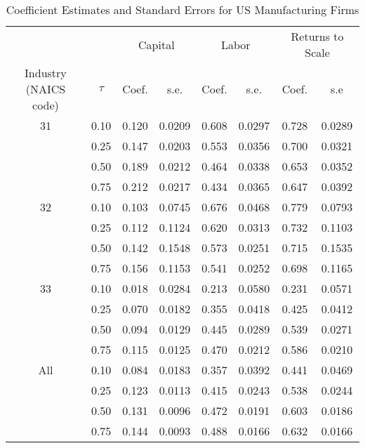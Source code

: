 \begin{table}[ht]
\centering
\caption{Coefficient Estimates and Standard Errors for US Manufacturing Firms} 
\begin{tabular}{cccccccc}
  \hline\hline & & \multicolumn{2}{c}{Capital}  & \multicolumn{2}{c}{Labor} & \multicolumn{2}{c}{Returns to Scale} \\ \cmidrule(lr){3-4} \cmidrule(lr){5-6} \cmidrule(lr){7-8}Industry (NAICS code) & $\tau$ & Coef. & s.e. & Coef. & s.e. & Coef. & s.e \\ 
  \hline
31 & 0.10 & 0.120 & 0.0209 & 0.608 & 0.0297 & 0.728 & 0.0289 \\ 
   & 0.25 & 0.147 & 0.0203 & 0.553 & 0.0356 & 0.700 & 0.0321 \\ 
   & 0.50 & 0.189 & 0.0212 & 0.464 & 0.0338 & 0.653 & 0.0352 \\ 
   & 0.75 & 0.212 & 0.0217 & 0.434 & 0.0365 & 0.647 & 0.0392 \\ 
  32 & 0.10 & 0.103 & 0.0745 & 0.676 & 0.0468 & 0.779 & 0.0793 \\ 
   & 0.25 & 0.112 & 0.1124 & 0.620 & 0.0313 & 0.732 & 0.1103 \\ 
   & 0.50 & 0.142 & 0.1548 & 0.573 & 0.0251 & 0.715 & 0.1535 \\ 
   & 0.75 & 0.156 & 0.1153 & 0.541 & 0.0252 & 0.698 & 0.1165 \\ 
  33 & 0.10 & 0.018 & 0.0284 & 0.213 & 0.0580 & 0.231 & 0.0571 \\ 
   & 0.25 & 0.070 & 0.0182 & 0.355 & 0.0418 & 0.425 & 0.0412 \\ 
   & 0.50 & 0.094 & 0.0129 & 0.445 & 0.0289 & 0.539 & 0.0271 \\ 
   & 0.75 & 0.115 & 0.0125 & 0.470 & 0.0212 & 0.586 & 0.0210 \\ 
  All & 0.10 & 0.084 & 0.0183 & 0.357 & 0.0392 & 0.441 & 0.0469 \\ 
   & 0.25 & 0.123 & 0.0113 & 0.415 & 0.0243 & 0.538 & 0.0244 \\ 
   & 0.50 & 0.131 & 0.0096 & 0.472 & 0.0191 & 0.603 & 0.0186 \\ 
   & 0.75 & 0.144 & 0.0093 & 0.488 & 0.0166 & 0.632 & 0.0166 \\ 
   \hline
\end{tabular}
\end{table}
